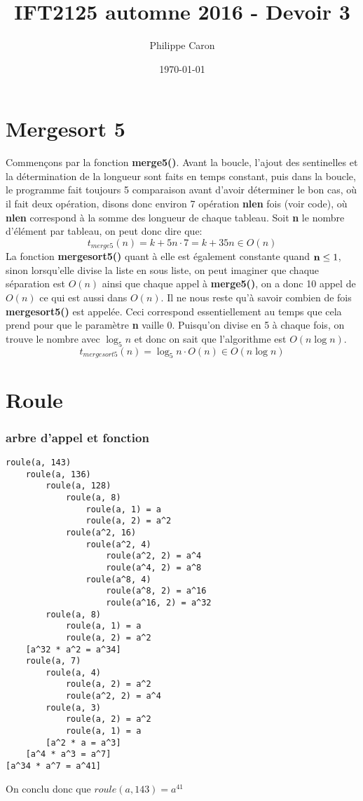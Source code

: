 \documentclass{article}
\title{\vspace{7cm}IFT2125 automne 2016 - Devoir 3} %
\author{Philippe Caron}
\date{\today}
\newcommand{\key}[1]{{\bf #1}}
\begin{document}
\maketitle

\pagebreak

\section{Mergesort 5}
Commençons par la fonction \key{merge5()}. Avant la boucle, l'ajout des sentinelles et la détermination de la longueur sont faits en temps constant, puis dans la boucle, le programme fait toujours 5 comparaison avant d'avoir déterminer le bon cas, où il fait deux opération, disons donc environ 7 opération \key{nlen} fois (voir code), où \key{nlen} correspond à la somme des longueur de chaque tableau. Soit \key{n} le nombre d'élément par tableau, on peut donc dire que:
$$t_{merge5}(n)= k + 5n \cdot 7 = k + 35n \in O(n)$$
La fonction \key{mergesort5()} quant à elle est également constante quand $\key{n} \leq 1$, sinon lorsqu'elle divise la liste en sous liste, on peut imaginer que chaque séparation est $O(n)$ ainsi que chaque appel à \key{merge5()}, on a donc 10 appel de $O(n)$ ce qui est aussi dans $O(n)$. Il ne nous reste qu'à savoir combien de fois \key{mergesort5()} est appelée. Ceci correspond essentiellement au temps que cela prend pour que le paramètre \key{n} vaille 0. Puisqu'on divise en 5 à chaque fois, on trouve le nombre avec $\log_5n$ et donc on sait que l'algorithme est $O(n \log n)$.
$$t_{mergesort5}(n)=\log_5n \cdot O(n) \in O(n\log n)$$

\section{Roule}
\subsubsection{arbre d'appel et fonction}
\begin{lstlisting}
roule(a, 143)
	roule(a, 136)
		roule(a, 128)
			roule(a, 8)
				roule(a, 1) = a
				roule(a, 2) = a^2
			roule(a^2, 16)
				roule(a^2, 4)
					roule(a^2, 2) = a^4
					roule(a^4, 2) = a^8
				roule(a^8, 4)
					roule(a^8, 2) = a^16
					roule(a^16, 2) = a^32
		roule(a, 8)
			roule(a, 1) = a
			roule(a, 2) = a^2
	[a^32 * a^2 = a^34]
	roule(a, 7)
		roule(a, 4)
			roule(a, 2) = a^2
			roule(a^2, 2) = a^4
		roule(a, 3)
			roule(a, 2) = a^2
			roule(a, 1) = a
		[a^2 * a = a^3]
	[a^4 * a^3 = a^7]
[a^34 * a^7 = a^41]
\end{lstlisting}
On conclu donc que $roule(a, 143) = a^{41}$
\end{document}
